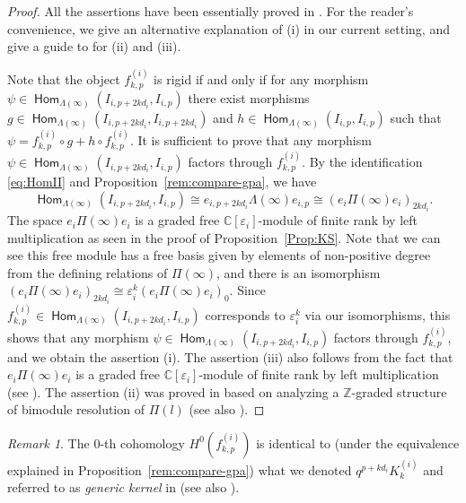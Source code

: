 \documentclass[12pt]{amsart}
\theoremstyle{definition}
\theoremstyle{remark}
\newtheorem{remark}[theorem]{Remark}
\numberwithin{equation}{section}
\newcommand{\opname}[1]{\operatorname{\mathsf{#1}}}
\newcommand{\Hom}{\opname{Hom}}
\begin{document}
\begin{proof}
    All the assertions have been essentially proved in \cite[\S5]{FM}. For the reader's convenience, we give an alternative explanation of (i) in our current setting, and give a guide to \cite{FM} for (ii) 
    and (iii).

    
    Note that the object $f^{(i)}_{k,p}$ is rigid if and only if for any morphism $\psi\in\Hom_{\Lambda(\infty)}(I_{i,p+2kd_i}, I_{i,p})$ there exist morphisms $g\in\Hom_{\Lambda(\infty)} (I_{i, p+2kd_i}, I_{i,p+2kd_i})$ and $h\in\Hom_{\Lambda(\infty)} (I_{i,p}, I_{i,p})$ such that $\psi = f^{(i)}_{k,p}\circ g + h\circ f^{(i)}_{k,p}$. It is sufficient to prove that any morphism $\psi\in \Hom_{\Lambda(\infty)}(I_{i,p+2kd_i}, I_{i,p})$ factors through $f^{(i)}_{k,p}$. By the identification \eqref{eq:HomII} and Proposition~\ref{rem:compare-gpa}, we have  \[\Hom_{\Lambda(\infty)}(I_{i,p+2kd_i}, I_{i,p})\cong e_{i,p+2kd_i} \Lambda(\infty) e_{i,p} \cong (e_i\Pi(\infty)e_i)_{2kd_i}.\] The space $e_i\Pi(\infty)e_i$ is a graded free $\mathbb{C}[\varepsilon_i]$-module of finite rank by left multiplication as seen in the proof of Proposition~\ref{Prop:KS}. Note that we can see this free module has a free basis given by elements of non-positive degree from the defining relations of $\Pi(\infty)$, and there is an isomorphism $(e_i\Pi(\infty)e_i)_{2kd_i} \cong \varepsilon_i^k(e_i\Pi(\infty)e_i)_{0}$. Since $f^{(i)}_{k,p}\in \Hom_{\Lambda(\infty)}(I_{i,p+2kd_i}, I_{i,p})$ corresponds to $\varepsilon_i^k$ via our isomorphisms, this shows that any morphism $\psi\in \Hom_{\Lambda(\infty)}(I_{i,p+2kd_i}, I_{i,p})$ factors through $f^{(i)}_{k,p}$, and we obtain the assertion (i). The assertion (iii) also follows from the fact that $e_i\Pi(\infty)e_i$ is a graded free $\mathbb{C}[\varepsilon_i]$-module of finite rank by left multiplication (see \cite[(5.1)]{FM}). The assertion (ii) was proved in \cite[Lemma~5.3, \S 3]{FM} based on analyzing a $\mathbb{Z}$-graded structure of bimodule resolution of $\Pi(l)$ (see also \cite[Proposition~12.1]{GLS-2017}).
\end{proof}
\begin{remark} \label{rem:KKR}
        The $0$-th cohomology $H^0(f^{(i)}_{k,p})$ is identical to (under the equivalence explained in Proposition~\ref{rem:compare-gpa})  what we denoted $q^{p+kd_i}K^{(i)}_k$ and referred to as \emph{generic kernel} in \cite[\S5]{FM} (see also \cite[Definition~4.5]{HL16}).
   
\end{remark}
\end{document}
